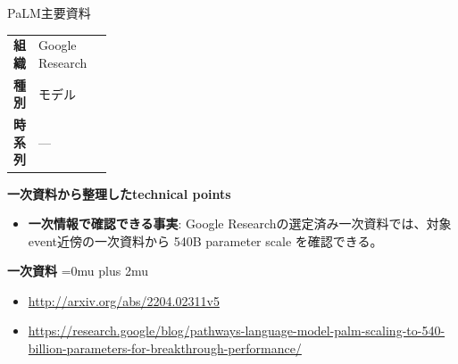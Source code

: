 \begin{technicalnote}{PaLM}{主要資料}
\begingroup
\begin{tabularx}{\linewidth}{@{}>{\bfseries}p{0.22\linewidth}X@{}}
組織 & Google Research \\
種別 & モデル \\
時系列 & — \\
\end{tabularx}
\smallskip
{\bfseries 一次資料から整理したtechnical points}
\begin{itemize}[leftmargin=1.5em,itemsep=0.35em]
\item \textbf{一次情報で確認できる事実}: Google Researchの選定済み一次資料では、対象event近傍の一次資料から 540B parameter scale を確認できる。
\end{itemize}
\begin{minipage}{\linewidth}
\begin{samepage}
{\bfseries 一次資料}
\begingroup\sloppy
\Urlmuskip=0mu plus 2mu\relax
\begin{itemize}[leftmargin=1.5em,itemsep=0.25em]
\item {\scriptsize\url{http://arxiv.org/abs/2204.02311v5}}
\item {\scriptsize\url{https://research.google/blog/pathways-language-model-palm-scaling-to-540-billion-parameters-for-breakthrough-performance/}}
\end{itemize}
\endgroup
\end{samepage}
\end{minipage}
\endgroup
\end{technicalnote}
\medskip

